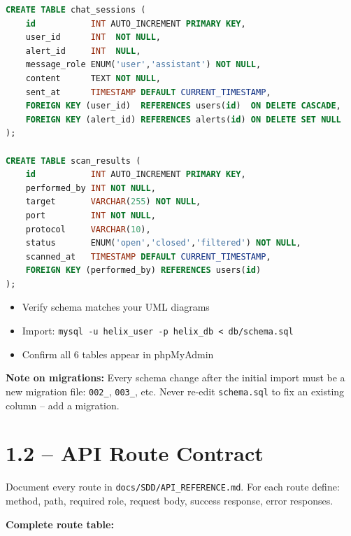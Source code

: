\documentclass[11pt,a4paper]{report}
\newcommand{\todo}{\textcolor{helixamber}{\textbf{[ ]}}}
\newcommand{\filepath}[1]{\texttt{\small#1}}
\begin{document}
\begin{lstlisting}[language=SQL]
CREATE TABLE chat_sessions (
    id           INT AUTO_INCREMENT PRIMARY KEY,
    user_id      INT  NOT NULL,
    alert_id     INT  NULL,
    message_role ENUM('user','assistant') NOT NULL,
    content      TEXT NOT NULL,
    sent_at      TIMESTAMP DEFAULT CURRENT_TIMESTAMP,
    FOREIGN KEY (user_id)  REFERENCES users(id)  ON DELETE CASCADE,
    FOREIGN KEY (alert_id) REFERENCES alerts(id) ON DELETE SET NULL
);

CREATE TABLE scan_results (
    id           INT AUTO_INCREMENT PRIMARY KEY,
    performed_by INT NOT NULL,
    target       VARCHAR(255) NOT NULL,
    port         INT NOT NULL,
    protocol     VARCHAR(10),
    status       ENUM('open','closed','filtered') NOT NULL,
    scanned_at   TIMESTAMP DEFAULT CURRENT_TIMESTAMP,
    FOREIGN KEY (performed_by) REFERENCES users(id)
);
\end{lstlisting}

\begin{itemize}
    \item[\todo] Verify schema matches your UML diagrams
    \item[\todo] Import: \texttt{mysql -u helix\_user -p helix\_db < db/schema.sql}
    \item[\todo] Confirm all 6 tables appear in phpMyAdmin
\end{itemize}

\textbf{Note on migrations:} Every schema change after the initial import must be a new migration file: \texttt{002\_}, \texttt{003\_}, etc. Never re-edit \filepath{schema.sql} to fix an existing column -- add a migration.

\section{1.2 -- API Route Contract}

Document every route in \filepath{docs/SDD/API\_REFERENCE.md}. For each route define: method, path, required role, request body, success response, error responses.

\textbf{Complete route table:}
\end{document}
